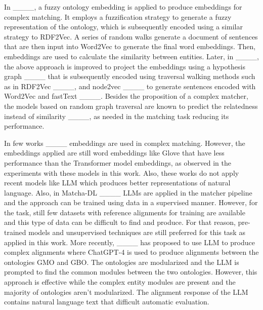 In ____, a fuzzy ontology embedding is applied to produce embeddings for complex matching. It employs a fuzzification strategy to generate a fuzzy representation of the ontology, which is subsequently encoded using a similar strategy to RDF2Vec. A series of random walks generate a document of sentences that are then input into Word2Vec to generate the final word embeddings. Then, embeddings are used to calculate the similarity between entities. Later, in ____, the above approach is improved to project the embeddings using a hypothesis graph ____ that is subsequently encoded using traversal walking methods such as in RDF2Vec ____, and node2vec ____ to generate sentences encoded with Word2Vec and fastText ____. Besides the proposition of a complex matcher, the models based on random graph traversal are known to predict the relatedness instead of similarity ____, as needed in the matching task reducing its performance.

In few works ____ embeddings are used in complex matching. However, the embeddings applied are still word embeddings like Glove that have less performance than the Transformer model embeddings, as observed in the experiments with these models in this work. Also, these works do not apply recent models like LLM which produces better representations of natural language. Also, in Matcha-DL ____ LLMs are applied in the matcher pipeline and the approach can be trained using data in a supervised manner. However, for the task, still few datasets with reference alignments for training are available and this type of data can be difficult to find and produce. For that reason, pre-trained models and unsupervised techniques are still preferred for this task as applied in this work. More recently, ____ has proposed to use LLM to produce complex alignments where ChatGPT-4 is used to produce alignments between the ontologies GMO and GBO. The ontologies are modularized and the LLM is prompted to find the common modules between the two ontologies. However, this approach is effective while the complex entity modules are present and the majority of ontologies aren't modularized. The alignment response of the LLM contains natural language text that difficult automatic evaluation.
